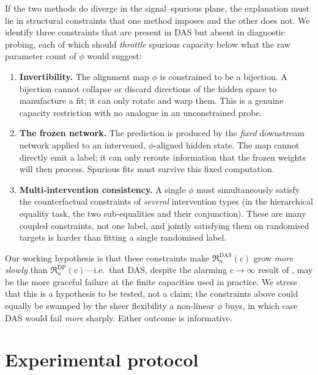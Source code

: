 \documentclass[11pt]{article}
\newcommand{\rade}{\mathfrak{R}}         %
\newcommand{\complexity}{c}              %
\begin{document}
If the two methods do diverge in the signal--spurious plane, the explanation must
lie in structural constraints that one method imposes and the other does not. We
identify three constraints that are present in DAS but absent in diagnostic
probing, each of which should \emph{throttle} spurious capacity below what the raw
parameter count of $\phi$ would suggest:

\begin{enumerate}[leftmargin=1.6em,itemsep=2pt]
  \item \textbf{Invertibility.} The alignment map $\phi$ is constrained to be a
  bijection. A bijection cannot collapse or discard directions of the hidden space
  to manufacture a fit; it can only rotate and warp them. This is a genuine
  capacity restriction with no analogue in an unconstrained probe.
  \item \textbf{The frozen network.} The prediction is produced by the
  \emph{fixed} downstream network applied to an intervened, $\phi$-aligned hidden
  state. The map cannot directly emit a label; it can only reroute information that
  the frozen weights will then process. Spurious fits must survive this fixed
  computation.
  \item \textbf{Multi-intervention consistency.} A single $\phi$ must
  simultaneously satisfy the counterfactual constraints of \emph{several}
  intervention types (in the hierarchical equality task, the two sub-equalities
  and their conjunction). These are many coupled constraints, not one label, and
  jointly satisfying them on randomised targets is harder than fitting a single
  randomised label.
\end{enumerate}

Our working hypothesis is that these constraints make
$\rade_n^{\mathrm{DAS}}(\complexity)$ grow \emph{more slowly} than
$\rade_n^{\mathrm{DP}}(\complexity)$---i.e.\ that DAS, despite the alarming
$\complexity\to\infty$ result of \citet{sutter2025nonlinear}, may be the more
graceful failure at the finite capacities used in practice. We stress that this is
a hypothesis to be tested, not a claim; the constraints above could equally be
swamped by the sheer flexibility a non-linear $\phi$ buys, in which case DAS would
fail \emph{more} sharply. Either outcome is informative.

\section{Experimental protocol}\label{sec:protocol}
\end{document}
